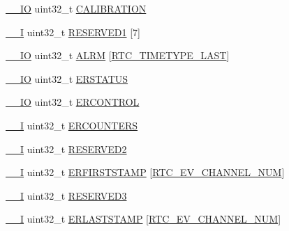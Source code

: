 \begin{DoxyCompactItemize}
\item 
\hyperlink{core__sc300_8h_aec43007d9998a0a0e01faede4133d6be}{\+\_\+\+\_\+\+IO} uint32\+\_\+t \hyperlink{struct_l_p_c___r_t_c___t_ade5b98ca9e6ea8af2fd91e8a4f20503b}{C\+A\+L\+I\+B\+R\+A\+T\+I\+ON}
\item 
\hyperlink{core__sc300_8h_af63697ed9952cc71e1225efe205f6cd3}{\+\_\+\+\_\+I} uint32\+\_\+t \hyperlink{struct_l_p_c___r_t_c___t_aba6975085fa7b58735e0227bf956eaab}{R\+E\+S\+E\+R\+V\+E\+D1} \mbox{[}7\mbox{]}
\item 
\hyperlink{core__sc300_8h_aec43007d9998a0a0e01faede4133d6be}{\+\_\+\+\_\+\+IO} uint32\+\_\+t \hyperlink{struct_l_p_c___r_t_c___t_abeb0bd5d52ee9f40f515b9b007c7a832}{A\+L\+RM} \mbox{[}\hyperlink{group___r_t_c__18_x_x__43_x_x_gga8144898fe628404d396db06dc8aac0e0a0d4fafef57b6ef363f9a0875ff339cad}{R\+T\+C\+\_\+\+T\+I\+M\+E\+T\+Y\+P\+E\+\_\+\+L\+A\+ST}\mbox{]}
\item 
\hyperlink{core__sc300_8h_aec43007d9998a0a0e01faede4133d6be}{\+\_\+\+\_\+\+IO} uint32\+\_\+t \hyperlink{struct_l_p_c___r_t_c___t_a282c9156460496e46e7248d853f95167}{E\+R\+S\+T\+A\+T\+US}
\item 
\hyperlink{core__sc300_8h_aec43007d9998a0a0e01faede4133d6be}{\+\_\+\+\_\+\+IO} uint32\+\_\+t \hyperlink{struct_l_p_c___r_t_c___t_adcd0073be8f4dfd72986026aeb1ec3ac}{E\+R\+C\+O\+N\+T\+R\+OL}
\item 
\hyperlink{core__sc300_8h_af63697ed9952cc71e1225efe205f6cd3}{\+\_\+\+\_\+I} uint32\+\_\+t \hyperlink{struct_l_p_c___r_t_c___t_ad4bf87046bc0acbf75ace4470d9d6381}{E\+R\+C\+O\+U\+N\+T\+E\+RS}
\item 
\hyperlink{core__sc300_8h_af63697ed9952cc71e1225efe205f6cd3}{\+\_\+\+\_\+I} uint32\+\_\+t \hyperlink{struct_l_p_c___r_t_c___t_a9313ff2988c0de18393786658af74e9e}{R\+E\+S\+E\+R\+V\+E\+D2}
\item 
\hyperlink{core__sc300_8h_af63697ed9952cc71e1225efe205f6cd3}{\+\_\+\+\_\+I} uint32\+\_\+t \hyperlink{struct_l_p_c___r_t_c___t_a515f67338ca0aa2ebd5544bd5673c85f}{E\+R\+F\+I\+R\+S\+T\+S\+T\+A\+MP} \mbox{[}\hyperlink{group___r_t_c__18_x_x__43_x_x_ggaac7e8d7c66860037449fdde1bdfb657bae56aa8110b05663f96d666d4ce378c85}{R\+T\+C\+\_\+\+E\+V\+\_\+\+C\+H\+A\+N\+N\+E\+L\+\_\+\+N\+UM}\mbox{]}
\item 
\hyperlink{core__sc300_8h_af63697ed9952cc71e1225efe205f6cd3}{\+\_\+\+\_\+I} uint32\+\_\+t \hyperlink{struct_l_p_c___r_t_c___t_a9b2ddeb27e3fbd70992f2817d7f35f88}{R\+E\+S\+E\+R\+V\+E\+D3}
\item 
\hyperlink{core__sc300_8h_af63697ed9952cc71e1225efe205f6cd3}{\+\_\+\+\_\+I} uint32\+\_\+t \hyperlink{struct_l_p_c___r_t_c___t_a84ca90f0493e515352b85679d039e56d}{E\+R\+L\+A\+S\+T\+S\+T\+A\+MP} \mbox{[}\hyperlink{group___r_t_c__18_x_x__43_x_x_ggaac7e8d7c66860037449fdde1bdfb657bae56aa8110b05663f96d666d4ce378c85}{R\+T\+C\+\_\+\+E\+V\+\_\+\+C\+H\+A\+N\+N\+E\+L\+\_\+\+N\+UM}\mbox{]}
\end{DoxyCompactItemize}


